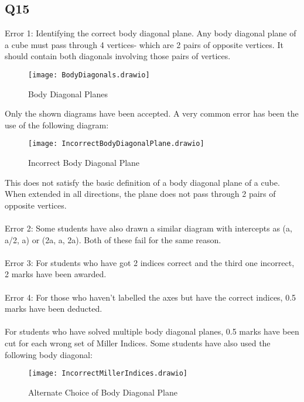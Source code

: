 \documentclass[12pt]{article}\date{}
\begin{document}
\subsection{Q15}

Error 1: Identifying the correct body diagonal plane. Any body diagonal plane of a cube must pass through 4 vertices- which are 2 pairs of opposite vertices. It should contain both diagonals involving those pairs of vertices. 

\begin{figure}[!ht]
  \centering
  \texttt{[image: BodyDiagonals.drawio]}
\begin{tiny}
\caption{Body Diagonal Planes}
\end{tiny}
\end{figure}

\noindent Only the shown diagrams have been accepted. A very common error has been the use of the following diagram:

\begin{figure}[!ht]
  \centering
  \texttt{[image: IncorrectBodyDiagonalPlane.drawio]}
\begin{tiny}
\caption{Incorrect Body Diagonal Plane}
\end{tiny}
\end{figure}

\noindent This does not satisfy the basic definition of a body diagonal plane of a cube. When extended in all directions, the plane does not pass through 2 pairs of opposite vertices. \\
\\
Error 2: Some students have also drawn a similar diagram with intercepts as (a, a/2, a) or (2a, a, 2a). Both of these fail for the same reason. \\
\\
Error 3: For students who have got 2 indices correct and the third one incorrect, 2 marks have been awarded. \\
\\
Error 4: For those who haven't labelled the axes but have the correct indices, 0.5 marks have been deducted. \\ \\
For students who have solved multiple body diagonal planes, 0.5 marks have been cut for each wrong set of Miller Indices. Some students have also used the following body diagonal:

\begin{figure}[!ht]
  \centering
  \texttt{[image: IncorrectMillerIndices.drawio]}
\begin{tiny}
\caption{Alternate Choice of Body Diagonal Plane}
\end{tiny}
\end{figure}
\end{document}
